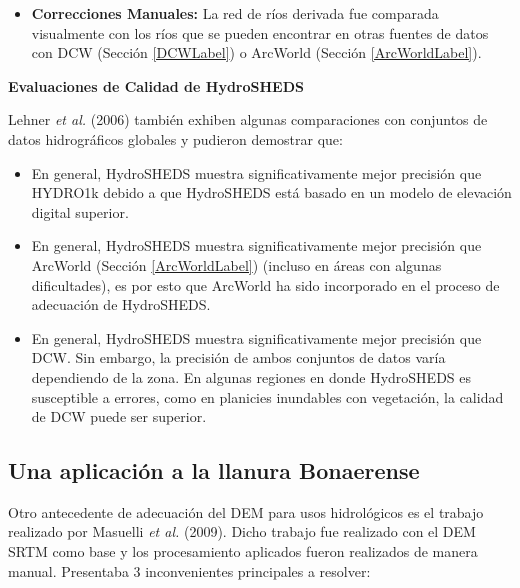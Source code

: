 \documentclass[10pt,a4paper, twoside]{report}
\begin{document}
\begin{itemize}
	\item \textbf{Correcciones Manuales:} La red de ríos derivada fue comparada visualmente con los ríos que se pueden encontrar en otras fuentes de datos con DCW (Sección \ref{DCWLabel}) o ArcWorld (Sección \ref{ArcWorldLabel}). 
	
\end{itemize}


\textbf{Evaluaciones de Calidad de HydroSHEDS}

Lehner \textit{et al.} (2006) también exhiben algunas comparaciones con conjuntos de datos hidrográficos globales y pudieron demostrar que:

\begin{itemize}
	\item En general, HydroSHEDS muestra significativamente mejor precisión que HYDRO1k debido a que HydroSHEDS está basado en un modelo de elevación digital superior.
	\item En general, HydroSHEDS muestra significativamente mejor precisión que ArcWorld (Sección \ref{ArcWorldLabel}) (incluso en áreas con algunas dificultades), es por esto que ArcWorld ha sido incorporado en el proceso de adecuación de HydroSHEDS.
	\item En general, HydroSHEDS muestra significativamente mejor precisión que DCW. Sin embargo, la precisión de ambos conjuntos de datos varía dependiendo de la zona. En algunas regiones en donde HydroSHEDS es susceptible a errores, como en planicies inundables con vegetación, la calidad de DCW puede ser superior.	
\end{itemize}





\subsection{Una aplicación a la llanura Bonaerense}
\label{trabajoSergioAntecedente}

Otro antecedente de adecuación del DEM para usos hidrológicos es el trabajo realizado por Masuelli \textit{et al.} (2009). Dicho trabajo fue realizado con el DEM SRTM como base y los procesamiento aplicados fueron realizados de manera manual. Presentaba 3 inconvenientes principales a resolver:
\end{document}
